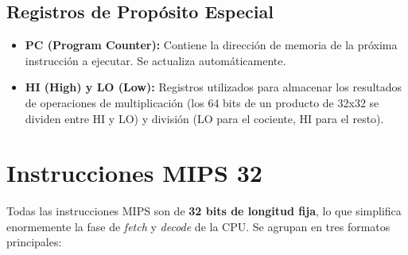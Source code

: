 \documentclass[letterpaper]{article}
\begin{document}
	\subsection{Registros de Propósito Especial}
	\begin{itemize}
		\item \textbf{PC (Program Counter):} Contiene la dirección de memoria de la próxima instrucción a ejecutar. Se actualiza automáticamente.
		\item \textbf{HI (High) y LO (Low):} Registros utilizados para almacenar los resultados de operaciones de multiplicación (los 64 bits de un producto de 32x32 se dividen entre HI y LO) y división (LO para el cociente, HI para el resto).
	\end{itemize}
	
	\section{Instrucciones MIPS 32}
	Todas las instrucciones MIPS son de \textbf{32 bits de longitud fija}, lo que simplifica enormemente la fase de \textit{fetch} y \textit{decode} de la CPU. Se agrupan en tres formatos principales:
	
\end{document}
